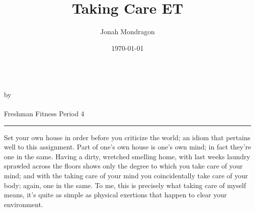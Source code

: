 \documentclass[12pt]{article}
\newcommand{\PutTitle}[1]
{
    \begin{center}
        {\huge\bfseries\thetitle}\\
        by \theauthor\\
        \thedate\\
        #1        
    \end{center}
    \hrule
    \vspace{2ex}
}
\begin{document}
\pagestyle{headings}

\title{Taking Care ET}
\author{Jonah Mondragon}
\date{\today}
\PutTitle{Freshman Fitness Period 4}

Set your own house in order before you criticize the world; an idiom that pertains well to this assignment.
Part of one's own house is one's own mind; in fact they're one in the same.
Having a dirty, wretched smelling home, with last weeks laundry sprawled across the floors shows only the degree to which you take care of your mind; and with the taking care of your mind you coincidentally take care of your body; again, one in the same.
To me, this is precisely what taking care of myself means, it's quite as simple as physical exertions that happen to clear your environment.
\end{document}
